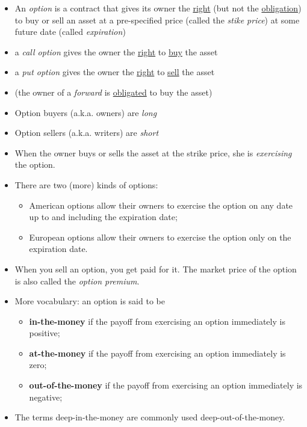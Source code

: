 \documentclass{beamer}
\begin{document}
\begin{frame}{}
	\begin{itemize}
		\item An \textit{option} is a contract that gives its owner the \underline{right} (but not the \underline{obligation}) to buy or sell an asset at a pre-specified price (called the \textit{stike price}) at some future date (called \textit{expiration})
	\item a \textit{call option} gives the owner the \underline{right} to \underline{buy} the asset
	\item a \textit{put option} gives the owner the \underline{right} to \underline{sell} the asset 
	\item (the owner of a \textit{forward} is \underline{obligated} to buy the asset)
	\item Option buyers (a.k.a. owners) are \textit{long} 
	\item Option sellers (a.k.a. writers) are \textit{short}
	\end{itemize}
\end{frame}

\begin{frame}{}
	\begin{itemize}
		\item When the owner buys or sells the asset at the strike price, she is \textit{exercising} the option. 
		\item There are two (more) kinds of options:
		\begin{itemize}
			\item American options allow their owners to exercise the option on any date up to and including the expiration date;
			\item European options allow their owners to exercise the option only on the expiration date. 
		\end{itemize}
		\item When you sell an option, you get paid for it. The market price of the option is also called the \textit{option premium}. 
		\item More vocabulary: an option is said to be
		\begin{itemize}
			\item \textbf{in-the-money} if the payoff from exercising an option immediately is positive;
			\item \textbf{at-the-money} if the payoff from exercising an option immediately is zero;
			\item \textbf{out-of-the-money} if the payoff from exercising an option immediately is negative;
		\end{itemize}
		\item The terms deep-in-the-money are commonly used deep-out-of-the-money.
	\end{itemize}
\end{frame}
\end{document}
